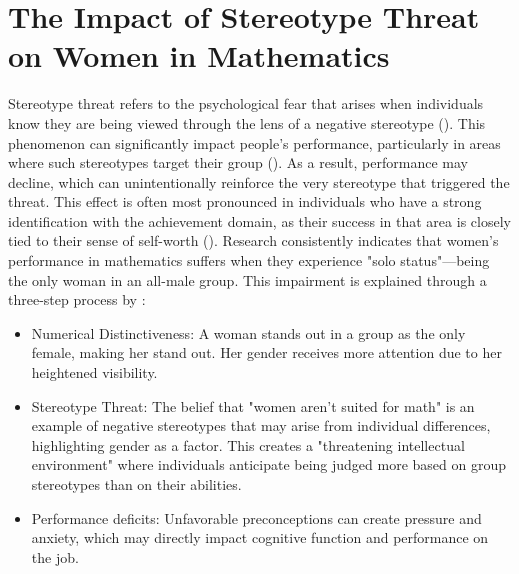 \section{The Impact of Stereotype Threat on Women in Mathematics}
Stereotype threat refers to the psychological fear that arises when individuals know they are being viewed through the lens of a negative stereotype (\cite{Beeghly2015}). This phenomenon can significantly impact people's performance, particularly in areas where such stereotypes target their group (\cite{Schmader2008}). As a result, performance may decline, which can unintentionally reinforce the very stereotype that triggered the threat. This effect is often most pronounced in individuals who have a strong identification with the achievement domain, as their success in that area is closely tied to their sense of self-worth (\cite{CROCKER199989}).
Research consistently indicates that women's performance in mathematics suffers when they experience "solo status"—being the only woman in an all-male group. This impairment is explained through a three-step process by \textcite{Beat}:
\begin{itemize}
    \item Numerical Distinctiveness: A woman stands out in a group as the only female, making her stand out. Her gender receives more attention due to her heightened visibility.
    \item Stereotype Threat: The belief that "women aren't suited for math" is an example of negative stereotypes that may arise from individual differences, highlighting gender as a factor. This creates a "threatening intellectual environment" where individuals anticipate being judged more based on group stereotypes than on their abilities.
    \item Performance deficits: Unfavorable preconceptions can create pressure and anxiety, which may directly impact cognitive function and performance on the job.
\end{itemize}
